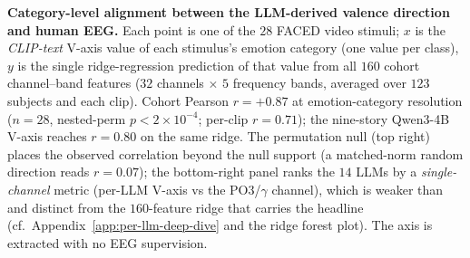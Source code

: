 \textbf{Category-level alignment between the LLM-derived valence
direction and human EEG.}
Each point is one of the $28$ FACED video stimuli; $x$ is the
\emph{CLIP-text} V-axis value of each stimulus's emotion category (one
value per class),
$y$ is the single ridge-regression prediction of that value from
all $160$ cohort channel--band features ($32$ channels $\times$ $5$
frequency bands, averaged over $123$ subjects and each clip).
Cohort Pearson $r{=}{+}0.87$ at emotion-category resolution
($n{=}28$, nested-perm $p<2{\times}10^{-4}$; per-clip $r{=}0.71$); the nine-story
Qwen3-4B V-axis reaches $r{=}0.80$ on the same ridge. The permutation
null (top right) places the observed correlation beyond the null
support (a matched-norm random direction reads $r{=}0.07$); the
bottom-right panel ranks the $14$ LLMs by a \emph{single-channel} metric
(per-LLM V-axis vs the PO3/$\gamma$ channel), which is weaker than and
distinct from the $160$-feature ridge that carries the headline
(cf.\ Appendix~\ref{app:per-llm-deep-dive} and the ridge forest plot).
The axis is extracted with no EEG supervision.
